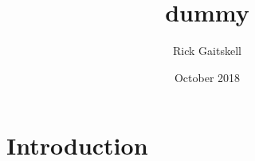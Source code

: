 \documentclass{article}
\title{dummy}
\author{Rick Gaitskell}
\date{October 2018}
\begin{document}
\maketitle

\section{Introduction}
\end{document}

